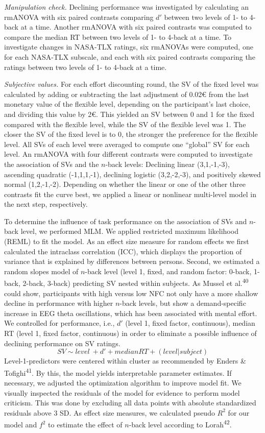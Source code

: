 \documentclass[
  man,floatsintext]{apa6}
\begin{document}
\emph{Manipulation check.}
Declining performance was investigated by calculating an rmANOVA with six paired contrasts comparing \(d'\) between two levels of 1- to 4-back at a time.
Another rmANOVA with six paired contrasts was computed to compare the median RT between two levels of 1- to 4-back at a time.
To investigate changes in NASA-TLX ratings, six rmANOVAs were computed, one for each NASA-TLX subscale, and each with six paired contrasts comparing the ratings between two levels of 1- to 4-back at a time.

\emph{Subjective values.}
For each effort discounting round, the SV of the fixed level was calculated by adding or subtracting the last adjustment of 0.02€ from the last monetary value of the flexible level, depending on the participant's last choice, and dividing this value by 2€.
This yielded an SV between 0 and 1 for the fixed compared with the flexible level, while the SV of the flexible level was 1.
The closer the SV of the fixed level is to 0, the stronger the preference for the flexible level.
All SVs of each level were averaged to compute one ``global'' SV for each level.
An rmANOVA with four different contrasts were computed to investigate the association of SVs and the \(n\)-back levels: Declining linear (3,1,-1,-3), ascending quadratic (-1,1,1,-1), declining logistic (3,2,-2,-3), and positively skewed normal (1,2,-1,-2).
Depending on whether the linear or one of the other three contrasts fit the curve best, we applied a linear or nonlinear multi-level model in the next step, respectively.

To determine the influence of task performance on the association of SVs and \(n\)-back level, we performed MLM.
We applied restricted maximum likelihood (REML) to fit the model.
As an effect size measure for random effects we first calculated the intraclass correlation (ICC), which displays the proportion of variance that is explained by differences between persons.
Second, we estimated a random slopes model of \(n\)-back level (level 1, fixed, and random factor: 0-back, 1-back, 2-back, 3-back) predicting SV nested within subjects.
As Mussel et al.\textsuperscript{40} could show, participants with high versus low NFC not only have a more shallow decline in performance with higher \(n\)-back levels, but show a demand-specific increase in EEG theta oscillations, which has been associated with mental effort.
We controlled for performance, i.e., \(d'\) (level 1, fixed factor, continuous), median RT (level 1, fixed factor, continuous) in order to eliminate a possible influence of declining performance on SV ratings.
\[
SV \sim level\ + d' + median RT + (level|subject)
\]
Level-1-predictors were centered within cluster as recommended by Enders \& Tofighi\textsuperscript{41}.
By this, the model yields interpretable parameter estimates.
If necessary, we adjusted the optimization algorithm to improve model fit.
We visually inspected the residuals of the model for evidence to perform model criticism.
This was done by excluding all data points with absolute standardized residuals above 3 SD.
As effect size measures, we calculated pseudo \(R^{2}\) for our model and \(f^{2}\) to estimate the effect of \(n\)-back level according to Lorah\textsuperscript{42}.
\end{document}
